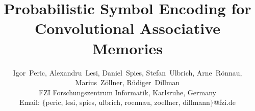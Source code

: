 \documentclass[journal]{journal}
\begin{document}
	\title{Probabilistic Symbol Encoding for \\Convolutional Associative Memories}
	
	
	\author{Igor~Peric, Alexandru~Lesi, Daniel~Spies, Stefan~Ulbrich, Arne~R{\"o}nnau, Marius~Z{\"o}llner, R{\"u}diger~Dillman\\
		FZI Forschungszentrum Informatik, Karlsruhe, Germany\\
		Email: $\{$peric, lesi, spies, ulbrich, roennau, zoellner, dillmann$\}$@fzi.de
	}
	
	
	
	
	
	
	\maketitle
	
\end{document}
